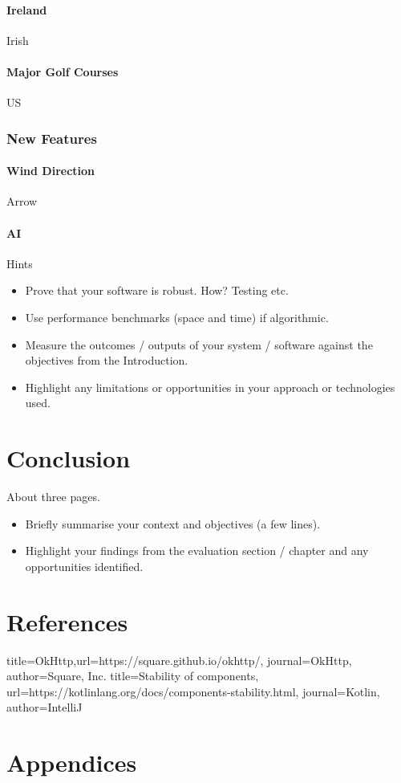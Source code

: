 \subsubsection{Ireland}
Irish
\subsubsection{Major Golf Courses}
US
\subsection{New Features}
\subsubsection{Wind Direction}
Arrow
\subsubsection{AI}
Hints
\begin{itemize}
\item Prove that your software is robust. How? Testing etc.
\item Use performance benchmarks (space and time) if algorithmic.
\item Measure the outcomes / outputs of your system / software against the objectives from the Introduction.
\item Highlight any limitations or opportunities in your approach or technologies used.
\end{itemize}
\chapter{Conclusion}
About three pages.
\begin{itemize}
\item Briefly summarise your context and objectives (a few lines).
\item Highlight your findings from the evaluation section / chapter and any opportunities identified.
\end{itemize}
\chapter{References}

\begin{thebibliography}{9}
 {title={OkHttp},url={https://square.github.io/okhttp/}, journal={OkHttp}, author={Square, Inc.}}
 {title={Stability of components},
url={https://kotlinlang.org/docs/components-stability.html}, journal={Kotlin}, author={IntelliJ}}


\end{thebibliography}
\chapter{Appendices}
